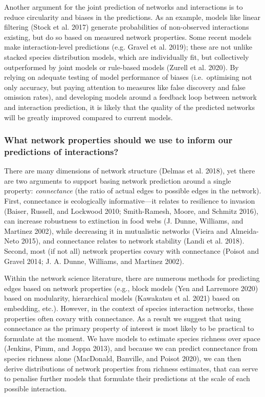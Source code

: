 \documentclass[11pt]{article}
\begin{document}
Another argument for the joint prediction of networks and interactions
is to reduce circularity and biases in the predictions. As an example,
models like linear filtering (Stock et al. 2017) generate probabilities
of non-observed interactions existing, but do so based on measured
network properties. Some recent models make interaction-level
predictions (e.g. Gravel et al. 2019); these are not unlike stacked
species distribution models, which are individually fit, but
collectively outperformed by joint models or rule-based models (Zurell
et al. 2020). By relying on adequate testing of model performance of
biases (i.e.~optimising not only accuracy, but paying attention to
measures like false discovery and false omission rates), and developing
models around a feedback loop between network and interaction
prediction, it is likely that the quality of the predicted networks will
be greatly improved compared to current models.

\hypertarget{what-network-properties-should-we-use-to-inform-our-predictions-of-interactions}{%
\subsubsection{What network properties should we use to inform our
predictions of
interactions?}\label{what-network-properties-should-we-use-to-inform-our-predictions-of-interactions}}

There are many dimensions of network structure (Delmas et al. 2018), yet
there are two arguments to support basing network prediction around a
single property: \emph{connectance} (the ratio of actual edges to
possible edges in the network). First, connectance is ecologically
informative---it relates to resilience to invasion (Baiser, Russell, and
Lockwood 2010; Smith-Ramesh, Moore, and Schmitz 2016), can increase
robustness to extinction in food webs (J. Dunne, Williams, and Martinez
2002), while decreasing it in mutualistic networks (Vieira and
Almeida-Neto 2015), and connectance relates to network stability (Landi
et al. 2018). Second, most (if not all) network properties covary with
connectance (Poisot and Gravel 2014; J. A. Dunne, Williams, and Martinez
2002).

Within the network science literature, there are numerous methods for
predicting edges based on network properties (e.g., block models (Yen
and Larremore 2020) based on modularity, hierarchical models (Kawakatsu
et al. 2021) based on embedding, etc.). However, in the context of
species interaction networks, these properties often covary with
connectance. As a result we suggest that using connectance as the
primary property of interest is most likely to be practical to formulate
at the moment. We have models to estimate species richness over space
(Jenkins, Pimm, and Joppa 2013), and because we can predict connectance
from species richness alone (MacDonald, Banville, and Poisot 2020), we
can then derive distributions of network properties from richness
estimates, that can serve to penalise further models that formulate
their predictions at the scale of each possible interaction.
\end{document}
